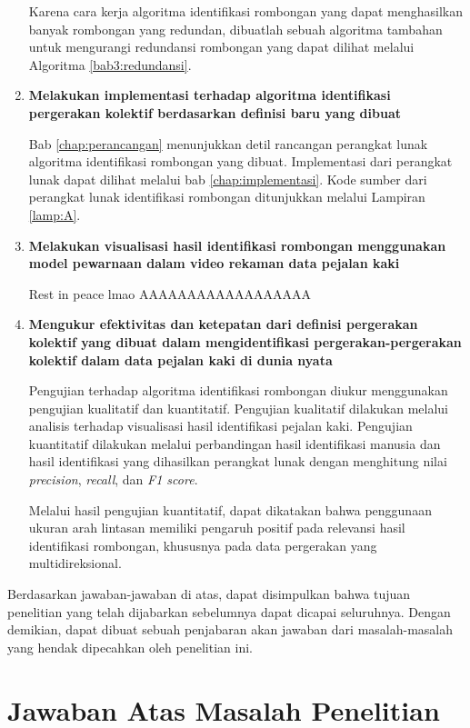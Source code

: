 \begin{enumerate}
    Karena cara kerja algoritma identifikasi rombongan yang dapat menghasilkan banyak rombongan yang redundan, dibuatlah sebuah algoritma tambahan untuk mengurangi redundansi rombongan yang dapat dilihat melalui Algoritma \ref{bab3:redundansi}.
    
    \item \textbf{Melakukan implementasi terhadap algoritma identifikasi pergerakan kolektif berdasarkan definisi baru yang dibuat}
    
    Bab \ref{chap:perancangan} menunjukkan detil rancangan perangkat lunak algoritma identifikasi rombongan yang dibuat. Implementasi dari perangkat lunak dapat dilihat melalui bab \ref{chap:implementasi}. Kode sumber dari perangkat lunak identifikasi rombongan ditunjukkan melalui Lampiran \ref{lamp:A}.
    
    \item \textbf{Melakukan visualisasi hasil identifikasi rombongan menggunakan model pewarnaan dalam video rekaman data pejalan kaki}
    
    Rest in peace lmao AAAAAAAAAAAAAAAAAA
    
    \item \textbf{Mengukur efektivitas dan ketepatan dari definisi pergerakan kolektif yang dibuat dalam mengidentifikasi pergerakan-pergerakan kolektif dalam data pejalan kaki di dunia nyata}
    
    Pengujian terhadap algoritma identifikasi rombongan diukur menggunakan pengujian kualitatif dan kuantitatif. Pengujian kualitatif dilakukan melalui analisis terhadap visualisasi hasil identifikasi pejalan kaki. Pengujian kuantitatif dilakukan melalui perbandingan hasil identifikasi manusia dan hasil identifikasi yang dihasilkan perangkat lunak dengan menghitung nilai \textit{precision}, \textit{recall}, dan \textit{F1 score}.
    
    Melalui hasil pengujian kuantitatif, dapat dikatakan bahwa penggunaan ukuran arah lintasan memiliki pengaruh positif pada relevansi hasil identifikasi rombongan, khususnya pada data pergerakan yang multidireksional.
\end{enumerate}

Berdasarkan jawaban-jawaban di atas, dapat disimpulkan bahwa tujuan penelitian yang telah dijabarkan sebelumnya dapat dicapai seluruhnya. Dengan demikian, dapat dibuat sebuah penjabaran akan jawaban dari masalah-masalah yang hendak dipecahkan oleh penelitian ini.

\section{Jawaban Atas Masalah Penelitian}
\label{sec:jawaban-masalah}

